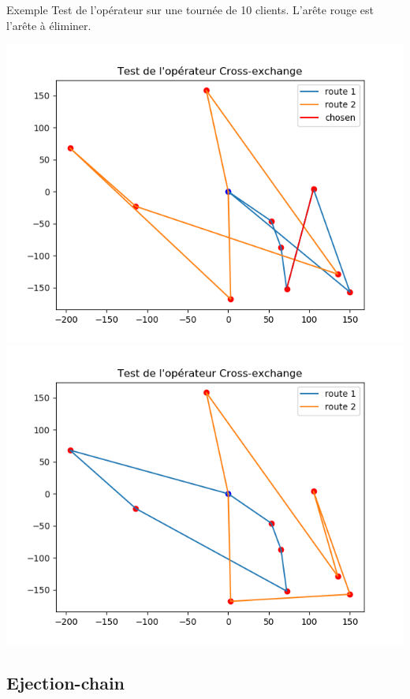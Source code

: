 \documentclass{beamer}
\begin{document}
\begin{frame}{Exemple}
Test de l'opérateur sur une tournée de 10 clients. L'arête rouge est l'arête à éliminer.

\begin{center}
\includegraphics[scale=0.25]{test1CE_init.png}
\includegraphics[scale=0.25]{test1CE_imp(corrige).png}
\end{center}

\end{frame}



\subsection{Ejection-chain}
\end{document}
